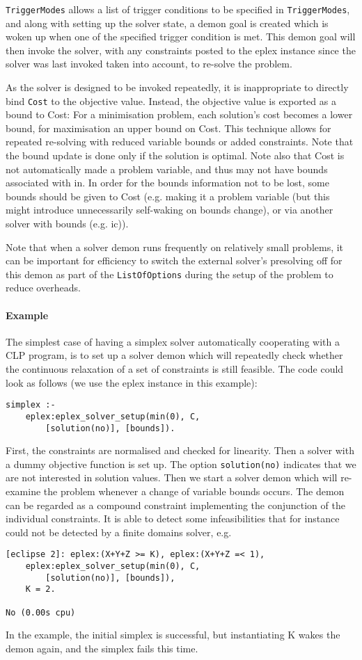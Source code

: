 {\tt TriggerModes} allows a list of trigger conditions
to be specified in {\tt TriggerModes}, and along with setting up the solver
state, a demon goal is created which is woken up when one of the
specified trigger condition is met. This demon goal will then invoke the
solver, with any 
constraints posted to the eplex instance since the solver was last invoked
taken into account, to re-solve the problem. 

As the solver is designed to be invoked repeatedly, it is inappropriate to
directly bind {\tt Cost} to the objective value. Instead, the objective
value is exported as a bound to Cost:
For a minimisation problem, each solution's
cost becomes a lower bound, for maximisation an upper bound on Cost.
This technique allows for repeated re-solving with reduced variable bounds
or added constraints. Note that the bound update is done only if the
solution is optimal. Note also that Cost is not automatically 
made a problem variable, and thus may not have bounds associated
with in. In order for the bounds information not to be lost, some bounds
should be given to Cost (e.g. making it a problem variable (but
this might introduce unnecessarily self-waking on bounds change), or via
another solver with bounds (e.g. ic)). 


Note that when a solver demon runs frequently on relatively small problems,
it can be important for efficiency to switch the external solver's
presolving off for this demon as part of the {\tt ListOfOptions} during the
setup of the problem to reduce overheads.

\paragraph{Example}

The simplest case of having a simplex solver automatically cooperating
with a CLP program, is to set up a solver demon which will repeatedly
check whether the continuous relaxation of a set of constraints
is still feasible.
The code could look as follows (we use the eplex instance in this example):
\begin{verbatim}
simplex :-
    eplex:eplex_solver_setup(min(0), C, 
        [solution(no)], [bounds]).
\end{verbatim}
First, the constraints are normalised and checked for linearity.
Then a solver with a dummy objective function is set up. The option
{\tt solution(no)} indicates that we are not interested in solution values.
Then we start a solver demon which will re-examine the problem
whenever a change of variable bounds occurs.
The demon can be regarded as a compound constraint implementing the
conjunction of the individual constraints. It is able to detect
some infeasibilities that for instance could not be detected by a
finite domains solver, e.g.
\begin{verbatim}
[eclipse 2]: eplex:(X+Y+Z >= K), eplex:(X+Y+Z =< 1),
    eplex:eplex_solver_setup(min(0), C, 
        [solution(no)], [bounds]),
    K = 2.

No (0.00s cpu)
\end{verbatim}
In the example, the initial simplex is successful, but instantiating
K wakes the demon again, and the simplex fails this time.

